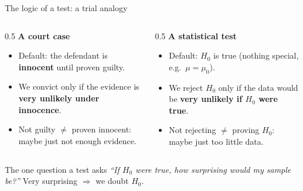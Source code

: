 \documentclass[
  11pt,
  ignorenonframetext,
  aspectratio=169,
]{beamer}
\providecommand{\tightlist}{%
  \setlength{\itemsep}{0pt}\setlength{\parskip}{0pt}}
\begin{document}
\begin{frame}{The logic of a test: a trial analogy}
\protect{}\label{the-logic-of-a-test-a-trial-analogy}
\begin{columns}[T]
\begin{column}{0.5\linewidth}
\textbf{A court case}

\begin{itemize}
\tightlist
\item
  Default: the defendant is \textbf{innocent} until proven guilty.
\item
  We convict only if the evidence is \textbf{very unlikely under
  innocence}.
\item
  Not guilty \(\neq\) proven innocent: maybe just not enough evidence.
\end{itemize}
\end{column}

\begin{column}{0.5\linewidth}
\textbf{A statistical test}

\begin{itemize}
\tightlist
\item
  Default: \(H_0\) is true (nothing special, e.g.~\(\mu=\mu_0\)).
\item
  We reject \(H_0\) only if the data would be \textbf{very unlikely if
  \(H_0\) were true}.
\item
  Not rejecting \(\neq\) proving \(H_0\): maybe just too little data.
\end{itemize}
\end{column}
\end{columns}

\begin{block}{The one question a test asks}
\protect{}\label{the-one-question-a-test-asks}
\emph{``If \(H_0\) were true, how surprising would my sample be?''} Very
surprising \(\Rightarrow\) we doubt \(H_0\).
\end{block}
\end{frame}
\end{document}

